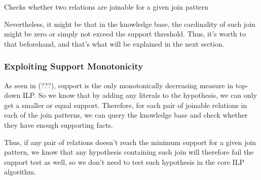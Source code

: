 \begin{algorithm}[!h]
 \caption{Checks whether two relations are joinable for a given join pattern}
 \label{alg1}
   {
  }
   {
  }
\end{algorithm}

Nevertheless, it might be that in the knowledge base, the cardinality of such join might be zero or simply not exceed
the support threshold. Thus, it's worth to that beforehand, and that's what will be explained in the next section.

\subsubsection{Exploiting Support Monotonicity}

As seen in (???), support is the only monotonically decreasing measure in top-down ILP. So we know that by adding any
literals to the hypothesis, we can only get a smaller or equal support. Therefore, for each pair of joinable relations
in each of the join patterns, we can query the knowledge base and check whether they have enough supporting facts.

Thus, if any pair of relations doesn't reach the minimum support for a given join pattern, we know that any hypothesis
containing such join will therefore fail the support test as well, so we don't need to test such hypothesis in the core
ILP algorithm.

